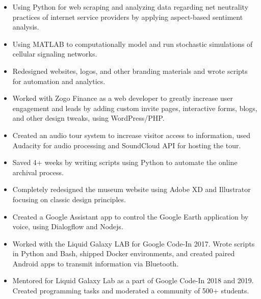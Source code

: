\documentclass[a4paper]{resume}
\begin{document}
\begin{itemize} \vspace{-5pt} \itemsep -2pt
	\item Using Python for web scraping and analyzing data regarding net neutrality practices of internet service providers by applying aspect-based sentiment analysis.	
\end{itemize}
\enresubsection
{}
\begin{itemize} \vspace{-5pt} \itemsep -2pt
	\item Using MATLAB to computationally model and run stochastic simulations of cellular signaling networks. 
\end{itemize}
\enresubsection
{}
\begin{itemize} \vspace{-5pt} \itemsep -2pt
	\item Redesigned websites, logos, and other branding materials and wrote scripts for automation and analytics.
	\item Worked with Zogo Finance as a web developer to greatly increase user engagement and leads by adding custom invite pages, interactive forms, blogs, and other design tweaks, using WordPress/PHP.
\end{itemize}
\enresubsection
{}
\begin{itemize} \vspace{-5pt} \itemsep -2pt
	\item Created an audio tour system to increase visitor access to information, used Audacity for audio processing and SoundCloud API for hosting the tour.
	\item Saved 4+ weeks by writing scripts using Python to automate the online archival process.
	\item Completely redesigned the museum website using Adobe XD and Illustrator focusing on classic design principles.
\end{itemize}
\enresubsection
{}
\begin{itemize} \vspace{-5pt} \itemsep -2pt
	\item Created a Google Assistant app to control the Google Earth application by voice, using Dialogflow and Nodejs.
	\item Worked with the Liquid Galaxy LAB for Google Code-In 2017. Wrote scripts in Python and Bash, shipped Docker environments, and created paired Android apps to transmit information via Bluetooth.
	\item Mentored for Liquid Galaxy Lab as a part of Google Code-In 2018 and 2019. Created programming tasks and moderated a community of 500+ students.
\end{itemize}
\enresection
\end{document}
